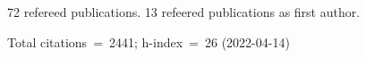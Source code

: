 72 refereed publications. 13 refeered publications as first author.

Total citations~=~2441; h-index~=~26 (2022-04-14)